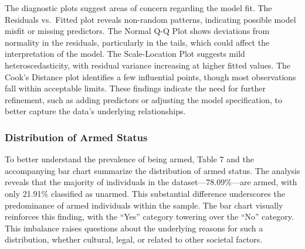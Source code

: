 \documentclass[
  letterpaper,
  DIV=11,
  numbers=noendperiod]{scrartcl}
\begin{document}
The diagnostic plots suggest areas of concern regarding the model fit.
The Residuals vs.~Fitted plot reveals non-random patterns, indicating
possible model misfit or missing predictors. The Normal Q-Q Plot shows
deviations from normality in the residuals, particularly in the tails,
which could affect the interpretation of the model. The Scale-Location
Plot suggests mild heteroscedasticity, with residual variance increasing
at higher fitted values. The Cook's Distance plot identifies a few
influential points, though most observations fall within acceptable
limits. These findings indicate the need for further refinement, such as
adding predictors or adjusting the model specification, to better
capture the data's underlying relationships.

\subsubsection{Distribution of Armed
Status}\label{distribution-of-armed-status}

To better understand the prevalence of being armed, Table 7 and the
accompanying bar chart summarize the distribution of armed status. The
analysis reveals that the majority of individuals in the
dataset---78.09\%---are armed, with only 21.91\% classified as unarmed.
This substantial difference underscores the predominance of armed
individuals within the sample. The bar chart visually reinforces this
finding, with the ``Yes'' category towering over the ``No'' category.
This imbalance raises questions about the underlying reasons for such a
distribution, whether cultural, legal, or related to other societal
factors.
\end{document}
